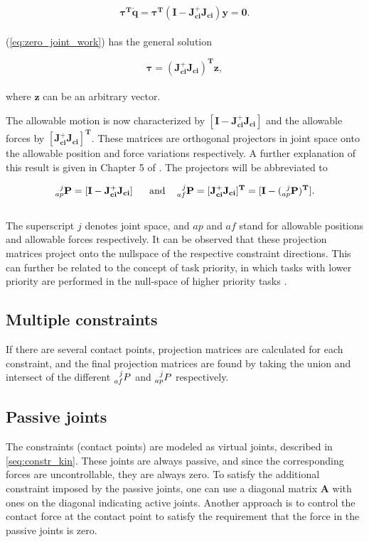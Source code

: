 \begin{equation} \label{eq:zero_joint_work}
    \boldsymbol{\tau^T} \mathbf{\dot{q}} = \boldsymbol{\tau^T} \mathbf{(I - J_{ci}^+ J_{ci}) y = 0}.
\end{equation}
\\
(\ref{eq:zero_joint_work}) has the general solution

\begin{equation}
   \boldsymbol{\tau}  \mathbf{= (J_{ci}^+ J_{ci})^T z},
\end{equation}
\\
where $\mathbf{z}$ can be an arbitrary vector.

The allowable motion is now characterized by $\mathbf{[I - J_{ci}^+ J_{ci}]}$ and the allowable forces by $\mathbf{[J_{ci}^+ J_{ci}]^T}$. These matrices are orthogonal projectors in joint space onto the allowable position and force variations respectively. A further explanation of this result is given in Chapter 5 of \cite{west1985method}. The projectors will be abbreviated to

\begin{equation}\label{eq:proj_mtrices}
    \mathbf{
    \prescript{j}{ap}{P} = [I - J_{ci}^+ J_{ci}] \ \ \quad \textrm{and} \quad
    \prescript{j}{af}{P} = [J_{ci}^+ J_{ci}]^T = [I - (\prescript{j}{ap}{P})^T]
    }.
\end{equation}
\\
The superscript $j$ denotes joint space, and $ap$ and $af$ stand for allowable positions and allowable forces respectively. It can be observed that these projection matrices project onto the nullspace of the respective constraint directions. This can further be related to the concept of task priority, in which tasks with lower priority are performed in the null-space of higher priority tasks \cite{chiaverini2008kinematically}.

\subsection{Multiple constraints}\label{subseq:mult_contacts}

If there are several contact points, projection matrices are calculated for each constraint, and the final projection matrices are found by taking the union and intersect of the different $\prescript{j}{af}{P}$ and $\prescript{j}{ap}{P}$ respectively.

\subsection{Passive joints}
The constraints (contact points) are modeled as virtual joints, described in \ref{seq:constr_kin}. These joints are always passive, and since the corresponding forces are uncontrollable, they are always zero. To satisfy the additional constraint imposed by the passive joints, one can use a diagonal matrix $\mathbf{A}$ with ones on the diagonal indicating active joints. Another approach is to control the contact force at the contact point to satisfy the requirement that the force in the passive joints is zero.

